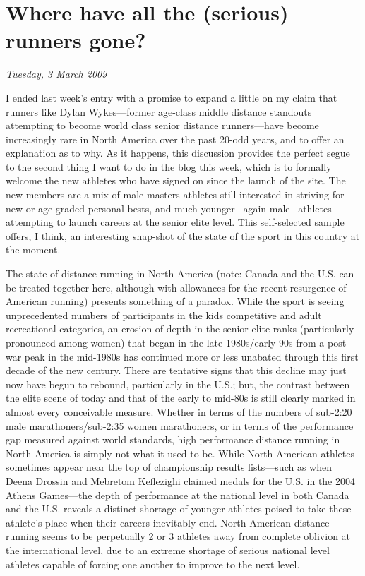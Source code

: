 \chapter{Where have all the (serious) runners gone?}
\textit{Tuesday, 3 March 2009}
\bigskip

I ended last week’s entry with a promise to expand a little on my claim that runners like Dylan Wykes—former age-class middle distance standouts attempting to become world class senior distance runners—have become increasingly rare in North America over the past 20-odd years, and to offer an explanation as to why. As it happens, this discussion provides the perfect segue to the second thing I want to do in the blog this week, which is to formally welcome the new athletes who have signed on since the launch of the site. The new members are a mix of male masters athletes still interested in striving for new or age-graded personal bests, and much younger-- again male-- athletes attempting to launch careers at the senior elite level. This self-selected sample offers, I think, an interesting snap-shot of the state of the sport in this country at the moment.

The state of distance running in North America (note: Canada and the U.S. can be treated together here, although with allowances for the recent resurgence of American running) presents something of a paradox. While the sport is seeing unprecedented numbers of participants in the kids competitive and adult recreational categories, an erosion of depth in the senior elite ranks (particularly pronounced among women) that began in the late 1980s/early 90s from a post-war peak in the mid-1980s has continued more or less unabated through this first decade of the new century. There are tentative signs that this decline may just now have begun to rebound, particularly in the U.S.; but, the contrast between the elite scene of today and that of the early to mid-80s is still clearly marked in almost every conceivable measure. Whether in terms of the numbers of sub-2:20 male marathoners/sub-2:35 women marathoners, or in terms of the performance gap measured against world standards, high performance distance running in North America is simply not what it used to be. While North American athletes sometimes appear near the top of championship results lists—such as when Deena Drossin and Mebretom Keflezighi claimed medals for the U.S. in the 2004 Athens Games—the depth of performance at the national level in both Canada and the U.S. reveals a distinct shortage of younger athletes poised to take these athlete’s place when their careers inevitably end. North American distance running seems to be perpetually 2 or 3 athletes away from complete oblivion at the international level, due to an extreme shortage of serious national level athletes capable of forcing one another to improve to the next level.

